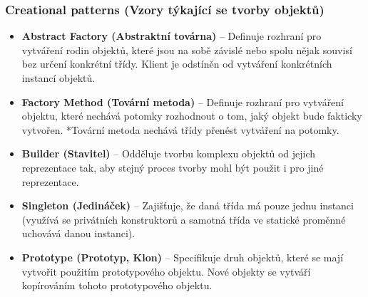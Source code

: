 \subsubsection{Creational patterns (Vzory týkající se tvorby objektů)}
\begin{itemize}
	\item \textbf{Abstract Factory (Abstraktní továrna)} -- Definuje rozhraní pro vytváření rodin objektů, které jsou na sobě závislé nebo spolu nějak souvisí bez určení konkrétní třídy. Klient je odstíněn od vytváření konkrétních instancí objektů.
	\item \textbf{Factory Method (Tovární metoda)} -- Definuje rozhraní pro vytváření objektu, které nechává potomky rozhodnout o tom, jaký objekt bude fakticky vytvořen. *Tovární metoda nechává třídy přenést vytváření na potomky.
	\item \textbf{Builder (Stavitel)} -- Odděluje tvorbu komplexu objektů od jejich reprezentace tak, aby stejný proces tvorby mohl být použit i pro jiné reprezentace.
	\item \textbf{Singleton (Jedináček)} -- Zajišťuje, že daná třída má pouze jednu instanci (využívá se privátních konstruktorů a samotná třída ve statické proměnné uchovává danou instanci).
	\item \textbf{Prototype (Prototyp, Klon)} -- Specifikuje druh objektů, které se mají vytvořit použitím prototypového objektu. Nové objekty se vytváří kopírováním tohoto prototypového objektu.
\end{itemize}

